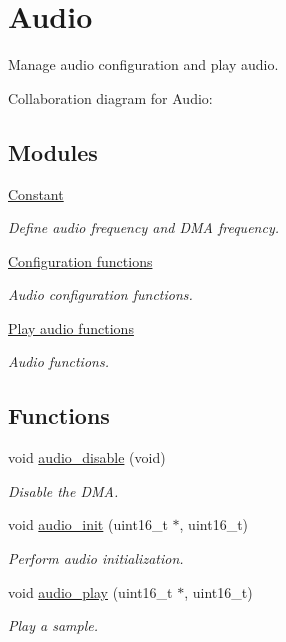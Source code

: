 \hypertarget{group___audio}{}\section{Audio}
\label{group___audio}


Manage audio configuration and play audio.  


Collaboration diagram for Audio\+:
\subsection*{Modules}
\begin{DoxyCompactItemize}
\item 
\hyperlink{group___constant}{Constant}
\begin{DoxyCompactList}\small\item\em Define audio frequency and D\+MA frequency. \end{DoxyCompactList}\item 
\hyperlink{group___audio___init}{Configuration functions}
\begin{DoxyCompactList}\small\item\em Audio configuration functions. \end{DoxyCompactList}\item 
\hyperlink{group___audio___play}{Play audio functions}
\begin{DoxyCompactList}\small\item\em Audio functions. \end{DoxyCompactList}\end{DoxyCompactItemize}
\subsection*{Functions}
\begin{DoxyCompactItemize}
\item 
void \hyperlink{group___audio_gafff6cd7f4332d078ce0114143cd30998}{audio\+\_\+disable} (void)
\begin{DoxyCompactList}\small\item\em Disable the D\+MA. \end{DoxyCompactList}\item 
void \hyperlink{group___audio_ga6a621a84280fa05373990982dacce11b}{audio\+\_\+init} (uint16\+\_\+t $\ast$, uint16\+\_\+t)
\begin{DoxyCompactList}\small\item\em Perform audio initialization. \end{DoxyCompactList}\item 
void \hyperlink{group___audio_ga286b07d3729ae2bfdf88bcd777dd93cf}{audio\+\_\+play} (uint16\+\_\+t $\ast$, uint16\+\_\+t)
\begin{DoxyCompactList}\small\item\em Play a sample. \end{DoxyCompactList}\end{DoxyCompactItemize}


